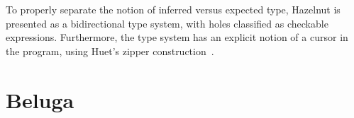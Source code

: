 To properly separate the notion of inferred versus expected type, Hazelnut is
presented as a bidirectional type system, with holes classified as checkable
expressions.
Furthermore, the type system has an explicit notion of a cursor in the program,
using Huet's zipper construction~\cite{zipper}.

\section{Beluga}
\label{sec:beluga-intro}

%
